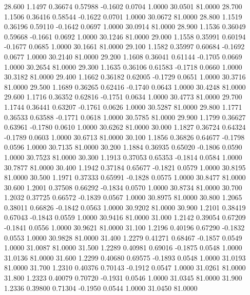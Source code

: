   28.600   1.1497   0.36674   0.57988  -0.1602   0.0704   1.0000  30.0501  81.0000
  28.700   1.1506   0.36416   0.58544  -0.1622   0.0701   1.0000  30.0672  81.0000
  28.800   1.1519   0.36196   0.59110  -0.1642   0.0697   1.0000  30.0914  81.0000
  28.900   1.1536   0.36049   0.59668  -0.1661   0.0692   1.0000  30.1246  81.0000
  29.000   1.1558   0.35991   0.60194  -0.1677   0.0685   1.0000  30.1661  81.0000
  29.100   1.1582   0.35997   0.60684  -0.1692   0.0677   1.0000  30.2140  81.0000
  29.200   1.1608   0.36041   0.61144  -0.1705   0.0669   1.0000  30.2654  81.0000
  29.300   1.1635   0.36106   0.61583  -0.1718   0.0660   1.0000  30.3182  81.0000
  29.400   1.1662   0.36182   0.62005  -0.1729   0.0651   1.0000  30.3716  81.0000
  29.500   1.1689   0.36265   0.62416  -0.1740   0.0643   1.0000  30.4248  81.0000
  29.600   1.1716   0.36352   0.62816  -0.1751   0.0634   1.0000  30.4773  81.0000
  29.700   1.1744   0.36441   0.63207  -0.1761   0.0626   1.0000  30.5287  81.0000
  29.800   1.1771   0.36533   0.63588  -0.1771   0.0618   1.0000  30.5785  81.0000
  29.900   1.1799   0.36627   0.63961  -0.1780   0.0610   1.0000  30.6262  81.0000
  30.000   1.1827   0.36724   0.64324  -0.1789   0.0603   1.0000  30.6713  81.0000
  30.100   1.1856   0.36826   0.64677  -0.1798   0.0596   1.0000  30.7135  81.0000
  30.200   1.1884   0.36935   0.65020  -0.1806   0.0590   1.0000  30.7523  81.0000
  30.300   1.1913   0.37053   0.65353  -0.1814   0.0584   1.0000  30.7877  81.0000
  30.400   1.1942   0.37184   0.65677  -0.1821   0.0579   1.0000  30.8195  81.0000
  30.500   1.1971   0.37333   0.65991  -0.1828   0.0575   1.0000  30.8477  81.0000
  30.600   1.2001   0.37508   0.66292  -0.1834   0.0570   1.0000  30.8734  81.0000
  30.700   1.2032   0.37725   0.66572  -0.1839   0.0567   1.0000  30.8975  81.0000
  30.800   1.2065   0.38011   0.66826  -0.1842   0.0563   1.0000  30.9202  81.0000
  30.900   1.2101   0.38419   0.67043  -0.1843   0.0559   1.0000  30.9416  81.0000
  31.000   1.2142   0.39054   0.67209  -0.1841   0.0556   1.0000  30.9621  81.0000
  31.100   1.2196   0.40196   0.67290  -0.1832   0.0553   1.0000  30.9828  81.0000
  31.400   1.2279   0.41271   0.68467  -0.1857   0.0549   1.0000  31.0087  81.0000
  31.500   1.2289   0.40981   0.69016  -0.1875   0.0548   1.0000  31.0136  81.0000
  31.600   1.2299   0.40680   0.69575  -0.1893   0.0548   1.0000  31.0193  81.0000
  31.700   1.2310   0.40376   0.70143  -0.1912   0.0547   1.0000  31.0261  81.0000
  31.800   1.2323   0.40079   0.70720  -0.1931   0.0546   1.0000  31.0345  81.0000
  31.900   1.2336   0.39800   0.71304  -0.1950   0.0544   1.0000  31.0450  81.0000
